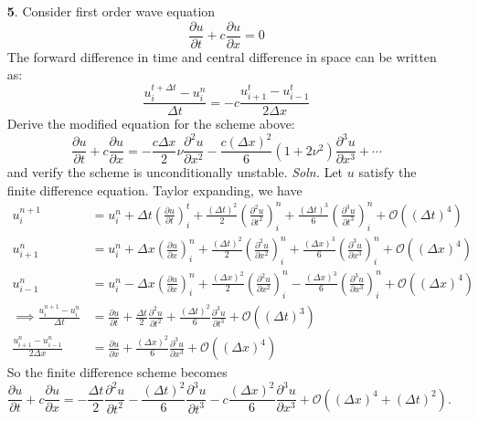 \documentclass{article}
\begin{document}
\begin{itemize}
    \pagebreak

    \item[\textbf{5}.] Consider first order wave equation
    \[\frac{\partial u}{\partial t} + c\frac{\partial u}{\partial x} = 0\]
    The forward difference in time and central difference in space can be written as:
    \[\frac{u_{i}^{t + \Delta t} - u_i^n}{\Delta t} = -c \frac{u_{i+1}^t - u_{i-1}^t}{2\Delta x}\]
    Derive the modified equation for the scheme above:
    \[\frac{\partial u}{\partial t} + c\frac{\partial u}{\partial x} = -\frac{c\Delta x}{2}\nu\frac{\partial^2u}{\partial x^2} - \frac{c(\Delta x)^2}{6}(1 + 2\nu^2)\frac{\partial^3u}{\partial x^3} + \cdots\]
    and verify the scheme is unconditionally unstable.
    \newline\newline
    \textit{Soln.} Let $u$ satisfy the finite difference equation. Taylor expanding, we have
    \begin{align*}
        u_i^{n+1} &= u_i^n + \Delta t\left(\frac{\partial u}{\partial t}\right)_i^t + \frac{(\Delta t)^2}{2}\left(\frac{\partial^2u}{\partial t^2}\right)_i^n + \frac{(\Delta t)^3}{6}\left(\frac{\partial^3u}{\partial t^3}\right)_i^n + \mathcal{O}((\Delta t)^4)\\
        u_{i+1}^n &= u_i^n + \Delta x\left(\frac{\partial u}{\partial x}\right)_i^n + \frac{(\Delta t)^2}{2}\left(\frac{\partial^2u}{\partial x^2}\right)_i^n + \frac{(\Delta x)^3}{6}\left(\frac{\partial^3u}{\partial x^3}\right)_i^n + \mathcal{O}((\Delta x)^4)\\
        u_{i - 1}^n &= u_i^n  - \Delta x\left(\frac{\partial u}{\partial x}\right)_i^n + \frac{(\Delta x)^2}{2}\left(\frac{\partial^2u}{\partial x^2}\right)_i^n - \frac{(\Delta x)^3}{6}\left(\frac{\partial^3u}{\partial x^3}\right)_i^n + \mathcal{O}((\Delta x)^4)\\
        \implies \frac{u_i^{n+1} - u_{i}^n}{\Delta t} &= \frac{\partial u}{\partial t} + \frac{\Delta t}{2}\frac{\partial^2u}{\partial t^2} + \frac{(\Delta t)^2}{6}\frac{\partial^3u}{\partial t^3} + \mathcal{O}((\Delta t)^3)\\
        \frac{u_{i+1}^n - u_{i-1}^n}{2\Delta x} &= \frac{\partial u}{\partial x} + \frac{(\Delta x)^2}{6}\frac{\partial^3u}{\partial x^3} + \mathcal{O}((\Delta x)^4)
    \end{align*}
    So the finite difference scheme becomes
    \begin{equation}
        \label{mod_eq_1}
        \frac{\partial u}{\partial t} + c\frac{\partial u}{\partial x} = -\frac{\Delta t}{2}\frac{\partial^2u}{\partial t^2} - \frac{(\Delta t)^2}{6}\frac{\partial^3u}{\partial t^3} - c\frac{(\Delta x)^2}{6}\frac{\partial^3u}{\partial x^3} + \mathcal{O}((\Delta x)^4 + (\Delta t)^2).

\end{equation}
\end{itemize}
\end{document}
